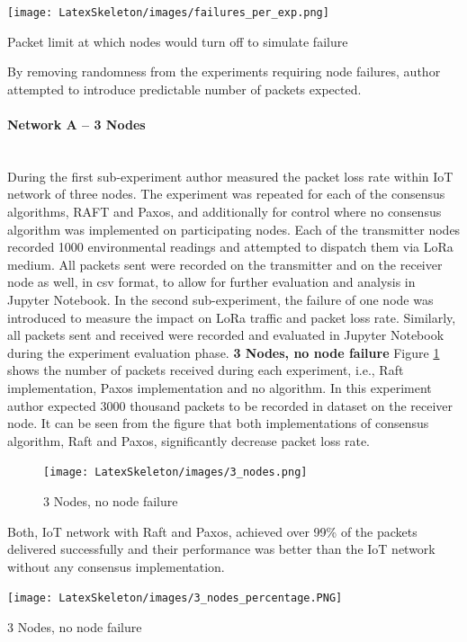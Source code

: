 \documentclass[oneside,12pt]{book}
\newcommand{\myparagraph}[1]{\paragraph{#1}\mbox{}\\}
\begin{document}
\begin{table}[H]
  \centering
  \label{tbl:Packet limit at which nodes would turn off to simulate failure}
  \texttt{[image: LatexSkeleton/images/failures\_per\_exp.png]}
  \caption{Packet limit at which nodes would turn off to simulate failure}
\end{table}
\noindent By removing randomness from the experiments requiring node failures, author attempted to introduce predictable number of packets expected.  
\myparagraph{Network A – 3 Nodes}
During the first sub-experiment author measured the packet loss rate within IoT network of three nodes. The experiment was repeated for each of the consensus algorithms, RAFT and Paxos, and additionally for control where no consensus algorithm was implemented on participating nodes. Each of the transmitter nodes recorded 1000 environmental readings and attempted to dispatch them  via LoRa medium. All packets sent were recorded on the transmitter and on the receiver node as well, in csv format, to allow for further evaluation and analysis in Jupyter Notebook.\smallskip \newline
In the second sub-experiment, the failure of one node was introduced to measure the impact on LoRa traffic and packet loss rate. Similarly, all packets sent and received were recorded and evaluated in Jupyter Notebook during the experiment evaluation phase.\smallskip \newline
\textbf{3 Nodes, no node failure}\smallskip \newline
Figure \ref{fig:3 Nodes, no node failure} shows the number of packets received during each experiment, i.e., Raft implementation, Paxos implementation and no algorithm. In this experiment author expected 3000 thousand packets to be recorded in dataset on the receiver node. It can be seen from the figure that both implementations of consensus algorithm, Raft and Paxos, significantly decrease packet loss rate. 
\begin{figure}[H]
    \centering
    \texttt{[image: LatexSkeleton/images/3\_nodes.png]}
    \caption{3 Nodes, no node failure}\label{fig:3 Nodes, no node failure}
\end{figure}
\noindent Both, IoT network with Raft and Paxos, achieved over 99\% of the packets delivered successfully and their performance was better than the IoT network without any consensus implementation.
\begin{table}[H]
  \centering
  \label{tbl:3 Nodes, no node failure}
  \texttt{[image: LatexSkeleton/images/3\_nodes\_percentage.PNG]}
  \caption{3 Nodes, no node failure}
\end{table}
\end{document}
